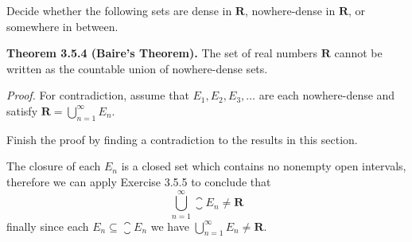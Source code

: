 \begin{exercise}
  Decide whether the following sets are dense in $\mathbf{R}$, nowhere-dense in $\mathbf{R}$, or somewhere in between.
\end{exercise}

\begin{solution}
\end{solution}

\begin{exercise}
  \textbf{Theorem 3.5.4 (Baire's Theorem).} The set of real numbers $\mathbf{R}$ cannot be written as the countable union of nowhere-dense sets.

  \textit{Proof.} For contradiction, assume that $E_{1}, E_{2}, E_{3}, \ldots$ are each nowhere-dense and satisfy $\mathbf{R}=\bigcup_{n=1}^{\infty} E_{n}$.

  Finish the proof by finding a contradiction to the results in this section.
\end{exercise}

\begin{solution}
  The closure of each $E_n$ is a closed set which contains no nonempty open intervals, therefore we can apply Exercise 3.5.5 to conclude that
  $$
  \bigcup_{n=1}^\infty \closure{E_n} \ne \mathbf{R}
  $$
  finally since each $E_n \subseteq \closure{E_n}$ we have $\bigcup_{n=1}^\infty E_n \ne \mathbf{R}$.
\end{solution}
